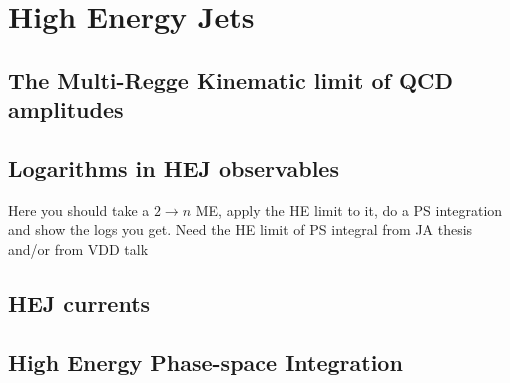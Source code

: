 \section{High Energy Jets}
\label{sec:section_name}

	\subsection{The Multi-Regge Kinematic limit of QCD amplitudes}
	\label{sub:subsection_name}

	\subsection{Logarithms in HEJ observables}
	\label{sub:subsection_name}

		Here you should take a $2\rightarrow n$ ME, apply the HE limit to it, do a PS integration and
		show the logs you get.  Need the HE limit of PS integral from JA thesis and/or from VDD talk

	\subsection{HEJ currents}
	\label{sub:currents}

	\subsection{High Energy Phase-space Integration}
	\label{sub:HEPhaseSpace}

